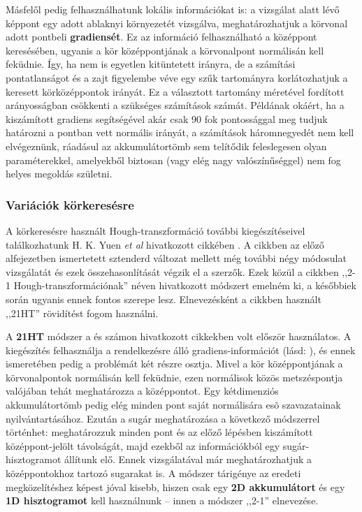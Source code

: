 Másfelől pedig felhasználhatunk lokális információkat is: a vizsgálat alatt lévő képpont egy adott ablaknyi környezetét vizsgálva, meghatározhatjuk a körvonal adott pontbeli \textbf{gradiensét}. Ez az információ felhasználható a középpont keresésében, ugyanis a kör középpontjának a körvonalpont normálisán kell feküdnie. Így, ha nem is egyetlen kitüntetett irányra, de a számítási pontatlanságot és a zajt figyelembe véve egy szűk tartományra korlátozhatjuk a keresett körközéppontok irányát. Ez a választott tartomány méretével fordított arányosságban csökkenti a szükséges számítások számát. Példának okáért, ha a kiszámított gradiens segítségével akár csak 90 fok pontossággal meg tudjuk határozni a pontban vett normális irányát, a számítások háromnegyedét nem kell elvégeznünk, ráadásul az akkumulátortömb sem telítődik feleslegesen olyan paraméterekkel, amelyekből biztosan (vagy elég nagy valószínűséggel) nem fog helyes megoldás születni.

\subsubsection{Variációk körkeresésre}\label{sect:korok_kiegeszites}

A körkeresésre használt Hough-transzformáció további kiegészítéseivel találkozhatunk H. K. Yuen \textit{et al} hivatkozott cikkében \cite{hough_circles}. A cikkben az előző alfejezetben ismertetett sztenderd változat mellett még további négy módosulat vizsgálatát és ezek összehasonlítását végzik el a szerzők. Ezek közül a cikkben ,,2-1 Hough-transzformációnak'' néven hivatkozott módszert emelném ki, a későbbiek során ugyanis ennek fontos szerepe lesz. Elnevezésként a cikkben használt ,,21HT'' rövidítést fogom használni.

A \textbf{21HT} módszer a \cite{hough_21_davies} és \cite{hough_21_illingworth} számon hivatkozott cikkekben volt először használatos. A kiegészítés felhasználja a rendelkezésre álló gradiens-információt (lásd: ), és ennek ismeretében pedig a problémát két részre osztja. Mivel a kör középpontjának a körvonalpontok normálisán kell feküdnie, ezen normálisok közös metszéspontja valójában tehát meghatározza a középpontot. Egy kétdimenziós akkumulátortömb pedig elég minden pont saját normálisára esõ szavazatainak nyilvántartásához. Ezután a sugár meghatározása a következő módszerrel történhet: meghatározzuk minden pont és az előző lépésben kiszámított középpont-jelölt távolságát, majd ezekből az információkból egy sugár-hisztogramot állítunk elő. Ennek vizsgálatával már meghatározhatjuk a középpontokhoz tartozó sugarakat is. A módszer tárigénye az eredeti megközelítéshez képest jóval kisebb, hiszen csak egy \textbf{2D akkumulátort} és egy \textbf{1D hisztogramot} kell használnunk -- innen a módszer ,,2-1'' elnevezése.

